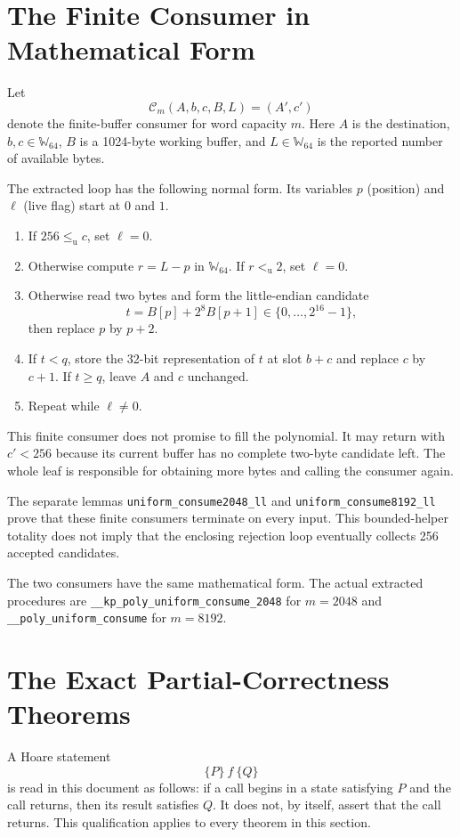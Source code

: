 \documentclass[11pt]{article}
\theoremstyle{definition}
\theoremstyle{plain}
\theoremstyle{remark}
\newcommand{\code}[1]{\nolinkurl{#1}}
\newcommand{\Wsixtyfour}{\mathbb W_{64}}
\newcommand{\Consumer}{\mathcal C}
\begin{document}
\section{The Finite Consumer in Mathematical Form}

Let
\[
  \Consumer_m(A,b,c,B,L)=(A',c')
\]
denote the finite-buffer consumer for word capacity $m$.  Here $A$ is the
destination, $b,c\in\Wsixtyfour$, $B$ is a 1024-byte working buffer, and
$L\in\Wsixtyfour$ is the reported number of available bytes.

The extracted loop has the following normal form.  Its variables
$p$ (position) and $\ell$ (live flag) start at $0$ and $1$.

\begin{enumerate}
\item If $256\le_{\mathrm u}c$, set $\ell=0$.
\item Otherwise compute $r=L-p$ in $\Wsixtyfour$.  If
  $r<_{\mathrm u}2$, set $\ell=0$.
\item Otherwise read two bytes and form the little-endian candidate
  \[
    t=B[p]+2^8B[p+1]\in\{0,\ldots,2^{16}-1\},
  \]
  then replace $p$ by $p+2$.
\item If $t<q$, store the 32-bit representation of $t$ at slot $b+c$ and
  replace $c$ by $c+1$.  If $t\ge q$, leave $A$ and $c$ unchanged.
\item Repeat while $\ell\ne0$.
\end{enumerate}

This finite consumer does not promise to fill the polynomial.  It may return
with $c'<256$ because its current buffer has no complete two-byte candidate
left.  The whole leaf is responsible for obtaining more bytes and calling the
consumer again.

The separate lemmas \code{uniform_consume2048_ll} and
\code{uniform_consume8192_ll} prove that these finite consumers terminate on
every input.  This bounded-helper totality does not imply that the enclosing
rejection loop eventually collects 256 accepted candidates.

The two consumers have the same mathematical form.  The actual extracted
procedures are \code{__kp_poly_uniform_consume_2048} for $m=2048$ and
\code{__poly_uniform_consume} for $m=8192$.

\section{The Exact Partial-Correctness Theorems}

A Hoare statement
\[
  \{P\}\ f\ \{Q\}
\]
is read in this document as follows: if a call begins in a state satisfying
$P$ and the call returns, then its result satisfies $Q$.  It does not, by
itself, assert that the call returns.  This qualification applies to every
theorem in this section.
\end{document}
